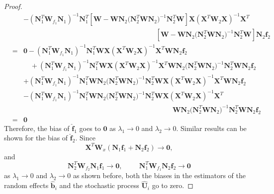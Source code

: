 \documentclass[review]{elsarticle}
\begin{document}
\begin{proof}
\begin{eqnarray*}
&& 
- (\boldsymbol N_1^T \boldsymbol W_{f_1}  \boldsymbol N_1)^{-1}  \boldsymbol N_1^T 
\left[ \boldsymbol W 
 -
\boldsymbol W \boldsymbol N_2 
 (\boldsymbol N_2^T  \boldsymbol W \boldsymbol N_2 \boldsymbol)^{-1} 
 \boldsymbol N_2^T  \boldsymbol W\right]
\boldsymbol X(\boldsymbol X^T  \boldsymbol W_2\boldsymbol X)^{-1}  \boldsymbol X^T  \\
&& \hspace{8cm}
\left[ \boldsymbol W 
 -
\boldsymbol W \boldsymbol N_2 
 (\boldsymbol N_2^T  \boldsymbol W \boldsymbol N_2 \boldsymbol)^{-1} 
 \boldsymbol N_2^T  \boldsymbol W\right]
\boldsymbol N_2 \boldsymbol f_2 \\
&=& 
\bm 0 
- (\boldsymbol N_1^T \boldsymbol W_{f_1}  \boldsymbol N_1)^{-1}  \boldsymbol N_1^T 
\boldsymbol W
\boldsymbol X(\boldsymbol X^T  \boldsymbol W_2\boldsymbol X)^{-1}  \boldsymbol X^T
\boldsymbol W \boldsymbol N_2 \boldsymbol f_2 \\
&& \quad
+ (\boldsymbol N_1^T \boldsymbol W_{f_1}  \boldsymbol N_1)^{-1}  \boldsymbol N_1^T 
 \boldsymbol W
\boldsymbol X(\boldsymbol X^T  \boldsymbol W_2\boldsymbol X)^{-1}  \boldsymbol X^T
\boldsymbol W \boldsymbol N_2 
 (\boldsymbol N_2^T  \boldsymbol W \boldsymbol N_2 \boldsymbol)^{-1} 
 \boldsymbol N_2^T  \boldsymbol W
\boldsymbol N_2 \boldsymbol f_2 \\
&& 
+ (\boldsymbol N_1^T \boldsymbol W_{f_1}  \boldsymbol N_1)^{-1}  \boldsymbol N_1^T 
\boldsymbol W \boldsymbol N_2 
 (\boldsymbol N_2^T  \boldsymbol W \boldsymbol N_2 \boldsymbol)^{-1} 
 \boldsymbol N_2^T  \boldsymbol W
\boldsymbol X(\boldsymbol X^T  \boldsymbol W_2\boldsymbol X)^{-1}  \boldsymbol X^T 
\boldsymbol W \boldsymbol N_2 \boldsymbol f_2 \\
&& 
- (\boldsymbol N_1^T \boldsymbol W_{f_1}  \boldsymbol N_1)^{-1}  \boldsymbol N_1^T 
\boldsymbol W \boldsymbol N_2 
 (\boldsymbol N_2^T  \boldsymbol W \boldsymbol N_2 \boldsymbol)^{-1} 
 \boldsymbol N_2^T  \boldsymbol W
\boldsymbol X(\boldsymbol X^T  \boldsymbol W_2\boldsymbol X)^{-1}  \boldsymbol X^T  \\
&& \hspace{9cm}
\boldsymbol W \boldsymbol N_2 
 (\boldsymbol N_2^T  \boldsymbol W \boldsymbol N_2 \boldsymbol)^{-1} 
 \boldsymbol N_2^T  \boldsymbol W
\boldsymbol N_2 \boldsymbol f_2\\
&=& \bm 0
\end{eqnarray*}
Therefore, the bias of $\bm {\hat f}_1$ goes to $\bm 0$ as $\lambda_1 \to 0$ and $\lambda_2 \to 0$.
Similar results can be shown for the bias of $\bm {\hat f}_2$.
Since 
$$\boldsymbol X^T  \boldsymbol W_x 
(\boldsymbol N_{1} \boldsymbol f_1 + 
  \boldsymbol N_{2} \boldsymbol f_2) \to \bm 0,
$$
and 
$$
\boldsymbol N_2^T \boldsymbol W_{f_2} \boldsymbol N_{1} \boldsymbol f_1 \to \bm 0,
\hspace{1cm}
\boldsymbol N_1^T \boldsymbol W_{f_1}
\boldsymbol N_2 \boldsymbol f_2 \to \bm 0
$$
as $\lambda_1 \to 0$ and $\lambda_2 \to 0$ as shown before, both the biases in the estimators of the random effects 
$\bm {\hat b}_i$ and the stochastic process $\bm {\hat U}_i$ go to zero. 
\end{proof}
\end{document}
